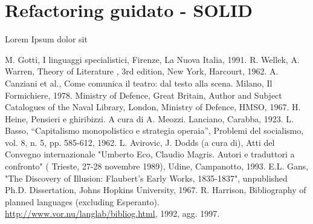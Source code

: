 \documentclass[12pt]{report}
\begin{document}
% 
% 
\section{Refactoring guidato - SOLID}
Lorem Ipsum dolor sit



%
%

%
%
\begin{thebibliography}{00}
%
M. Gotti, I linguaggi specialistici, Firenze, La Nuova Italia, 1991.
%
R. Wellek, A. Warren, Theory of Literature , 3rd edition, New York, Harcourt, 1962.
%
A. Canziani et al., Come comunica il teatro: dal testo alla scena. Milano, Il Formichiere, 1978.
%
Ministry of Defence, Great Britain, Author and Subject Catalogues of the Naval Library, London, Ministry of Defence, HMSO, 1967.
%
H. Heine, Pensieri e ghiribizzi. A cura di A. Meozzi. Lanciano, Carabba, 1923.
%
L. Basso, ``Capitalismo monopolistico e strategia operaia'', Problemi del socialismo, vol. 8, n. 5, pp. 585-612, 1962.
%
L. Avirovic, J. Dodds (a cura di), Atti del Convegno internazionale "Umberto Eco, Claudio Magris. Autori e traduttori a confronto" ( Trieste, 27-28 novembre 1989), Udine, Campanotto, 1993.
%
E.L. Gans, "The Discovery of Illusion: Flaubert's Early Works, 1835-1837", unpublished Ph.D. Dissertation, Johns Hopkins University, 1967.
%
R. Harrison, Bibliography of planned languages (excluding Esperanto).  \url{http://www.vor.nu/langlab/bibliog.html}, 1992, agg. 1997.
%
\end{thebibliography}
% 
\end{document}
